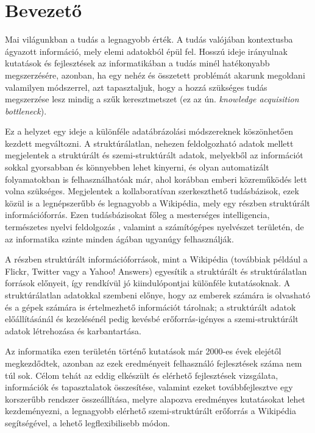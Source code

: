 
\chapter*{Bevezető}
\label{cha:intro}

Mai világunkban a tudás a legnagyobb érték. A tudás valójában kontextusba ágyazott információ, mely elemi adatokból épül fel. Hosszú ideje irányulnak kutatások és fejlesztések az informatikában a tudás minél hatékonyabb megszerzésére, azonban, ha egy nehéz és összetett problémát akarunk megoldani valamilyen módszerrel, azt tapasztaljuk, hogy a hozzá szükséges tudás megszerzése lesz mindig a szűk keresztmetszet \cite{aijournal} (ez az ún. \textit{knowledge acquisition bottleneck}).

Ez a helyzet egy ideje a különféle adatábrázolási módszereknek köszönhetően kezdett megváltozni. A struktúrálatlan, nehezen feldolgozható adatok mellett megjelentek a struktúrált és szemi-struktúrált adatok, melyekből az információt sokkal gyorsabban és könnyebben lehet kinyerni, és olyan automatizált folyamatokban is felhasználhatóak már, ahol korábban emberi közreműködés lett volna szükséges. Megjelentek a kollaboratívan szerkeszthető tudásbázisok, ezek közül is a legnépszerűbb és legnagyobb a Wikipédia, mely egy részben struktúrált információforrás. Ezen tudásbázisokat főleg a mesterséges intelligencia, természetes nyelvi feldolgozás \cite{sciborg}, valamint a számítógépes nyelvészet területén, de az informatika szinte minden ágában ugyanúgy felhasználják.

A részben struktúrált információforrások, mint a Wikipédia (továbbiak például a Flickr, Twitter vagy a Yahoo! Answers) egyesítik a struktúrált és struktúrálatlan források előnyeit, így rendkívül jó kiindulópontjai különféle kutatásoknak. A struktúrálatlan adatokkal szembeni előnye, hogy az emberek számára is olvasható és a gépek számára is értelmezhető információt tárolnak; a struktúrált adatok előállításánál és kezelésénél pedig kevésbé erőforrás-igényes a szemi-struktúrált adatok létrehozása és karbantartása.

Az informatika ezen területén történő kutatások már 2000-es évek elejétől megkezdődtek, azonban az ezek eredményeit felhasználó fejlesztések száma nem túl sok. Célom tehát az eddig elkészült és elérhető fejlesztések vizsgálata, információk és tapasztalatok összesítése, valamint ezeket továbbfejlesztve egy korszerűbb rendszer összeállítása, melyre alapozva eredményes kutatásokat lehet kezdeményezni, a legnagyobb elérhető szemi-struktúrált erőforrás a Wikipédia segítségével, a lehető legflexibilisebb módon.

